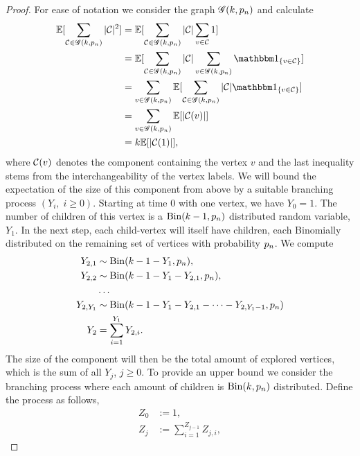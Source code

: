 \begin{proof}
	For ease of notation we consider the graph $\mathscr{G}(k,p_n)$ and calculate
	\begin{equation} \label{E: P(ExcEvent) 3}
	\begin{aligned}
	\Exp{\sum_{\Ccal \in \Gcal(k, \p)} |\Ccal|^2 } 
	&= \Exp{ \sum_{\Ccal \in \Gcal(k, \p)} |\Ccal| \sum_{v \in \Ccal} 1} \\
	&= \Exp{ \sum_{\Ccal \in \Gcal(k, \p)} |\Ccal| \sum_{v \in \Gcal(k, \p)} \Ind{\{v \in \Ccal\}} } \\
	&= \sum_{v \in \Gcal(k, \p)} \Exp{ \sum_{\Ccal \in \Gcal(k, \p)} |\Ccal| \Ind{\{v \in \Ccal\}} } \\ 
	&= \sum_{v \in \Gcal(k, \p)} \Exp{|\Ccal(v)|} \\
	&= k \Exp{|\Ccal(1)|},
	\end{aligned}
	\end{equation}
	where $\mathcal{C}(v)$ denotes the component containing the vertex $v$ and the last inequality stems from the interchangeability of the vertex labels.
	We will bound the expectation of the size of this component from above by a suitable branching process $(Y_i, \; i\geq 0)$.
	Starting at time $0$ with one vertex, we have $Y_0 = 1$.
	The number of children of this vertex is a $\operatorname*{Bin}(k-1, p_n)$ distributed random variable, $Y_1$.
	In the next step, each child-vertex will itself have children,
	each Binomially distributed on the remaining set of vertices with probability $ p_n$.
	We compute 
	\begin{equation}
	\begin{aligned}
	Y_{2,1} &\sim \operatorname*{Bin}(k-1-Y_1, p_n), \\ 
	Y_{2,2} &\sim \operatorname*{Bin}(k-1-Y_1-Y_{2,1}, p_n), \\
	&\dots \\
	Y_{2,Y_1} &\sim \operatorname*{Bin}(k-1-Y_1-Y_{2,1}-\dots-Y_{2,Y_1-1}, p_n) \\
	Y_2 &= \sum_{i=1}^{Y_1} Y_{2,i}.
	\end{aligned}
	\end{equation}
	The size of the component will then be the total amount of explored vertices,
	which is the sum of all $Y_j$, $j \geq 0$.
	To provide an upper bound we consider the branching process where each amount of children is $\operatorname*{Bin}(k, p_n)$ distributed.
	Define the process as follows,
	\begin{equation}
	\begin{aligned}
	Z_0 &:= 1, \\
	Z_j &:= \sum_{i=1}^{Z_{j-1}} Z_{j,i},
	\end{aligned}
	\end{equation}

\end{proof}
